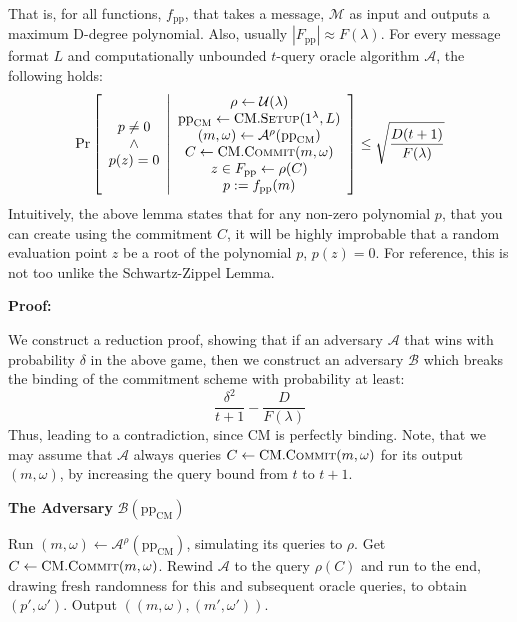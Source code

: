 \documentclass[
]{article}
\newcommand*\Ac{\mathcal{A}}
\newcommand*\Bc{\mathcal{B}}
\newcommand*\Mc{\mathcal{M}}
\renewcommand*\d{\delta}
\renewcommand*\l{\lambda}
\renewcommand*\o{\omega}
\newcommand*{\from}{\gets}
\newcommand*{\pp}{\mathrm{pp}}
\newcommand*{\Setup}{\mathrm{\text{S{\scriptsize ETUP}}}}
\newcommand*{\Commit}{\mathrm{\text{C{\scriptsize OMMIT}}}}
\newcommand*{\CM}{\mathrm{\text{CM}}}
\newcommand*{\CMSetup}{\CM.\Setup}
\newcommand*{\CMCommit}{\CM.\Commit}
\begin{document}
That is, for all functions, \(f_\pp\), that takes a message, \(\Mc\) as
input and outputs a maximum D-degree polynomial. Also, usually
\(|F_\pp| \approx F(\l)\). For every message format \(L\) and
computationally unbounded \(t\)-query oracle algorithm \(\Ac\), the
following holds: \[
\Pr\left[
  \begin{array}{c}
    p \neq 0 \\
    \land \\
    p(z) = 0
  \end{array}
  \middle|
  \begin{array}{c}
    \rho \from \mathcal{U}(\l) \\
    \pp_\CM \gets \CMSetup(1^\l, L) \\
    (m, \omega) \gets \Ac^\rho(\pp_\CM) \\
    C \gets \CMCommit(m, \o) \\
    z \in F_{\pp} \from \rho(C) \\
    p := f_{\pp}(m)
  \end{array}
\right] \leq \sqrt{\frac{D(t+1)}{F(\l)}}
\] Intuitively, the above lemma states that for any non-zero polynomial
\(p\), that you can create using the commitment \(C\), it will be highly
improbable that a random evaluation point \(z\) be a root of the
polynomial \(p\), \(p(z)
= 0\). For reference, this is not too unlike the Schwartz-Zippel Lemma.

\textbf{Proof:}

We construct a reduction proof, showing that if an adversary \(\Ac\)
that wins with probability \(\d\) in the above game, then we construct
an adversary \(\Bc\) which breaks the binding of the commitment scheme
with probability at least:
\[\frac{\delta^2}{t + 1} - \frac{D}{F(\lambda)}\] Thus, leading to a
contradiction, since \(\CM\) is perfectly binding. Note, that we may
assume that \(\Ac\) always queries \(C \from \CMCommit(m, \o)\) for its
output \((m, \o)\), by increasing the query bound from \(t\) to
\(t + 1\).

\begin{algorithm}[H]
\caption*{\textbf{The Adversary} $\Bc(\pp_\CM)$}
\begin{algorithmic}[1]
  \State Run $(m, \omega) \gets \Ac^\rho(\pp_\CM)$, simulating its queries to $\rho$.
  \State Get $C \gets \CMCommit(m, \o)$.
  \State Rewind $\Ac$ to the query $\rho(C)$ and run to the end, drawing fresh randomness for this and subsequent oracle queries, to obtain $(p', \omega')$.
  \State Output $((m, \omega), (m', \omega'))$.
\end{algorithmic}
\end{algorithm}
\end{document}
